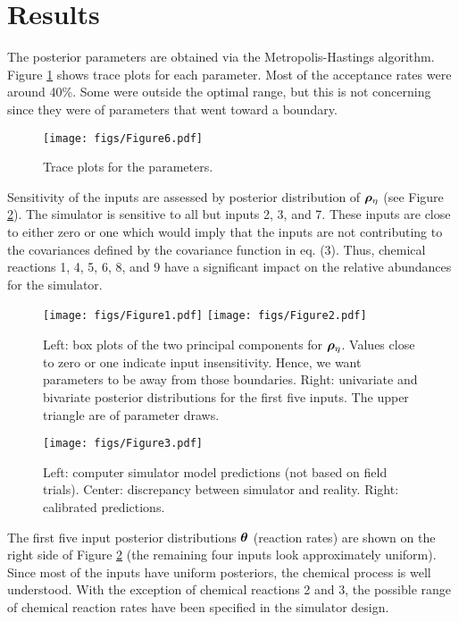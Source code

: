 \section{Results}

The posterior parameters are obtained via the Metropolis-Hastings algorithm. Figure \ref{trace} shows trace plots for each parameter. Most of the acceptance rates were around 40\%. Some were outside the optimal range, but this is not concerning since they were of parameters that went toward a boundary.


\begin{figure}
\begin{center}
\texttt{[image: figs/Figure6.pdf]}
\end{center}
\caption{Trace plots for the parameters.}
\label{trace}
\end{figure}

Sensitivity of the inputs are assessed by posterior distribution of $\mathbf{\bm{\rho}}_\eta$ (see Figure \ref{box}). The simulator is sensitive to all but inputs 2, 3, and 7. These inputs are close to either zero or one which would imply that the inputs are not contributing to the covariances defined by the covariance function in eq. (3). Thus, chemical reactions 1, 4, 5, 6, 8, and 9 have a significant impact on the relative abundances for the simulator.

\begin{figure}
\begin{center}
\texttt{[image: figs/Figure1.pdf]}
\texttt{[image: figs/Figure2.pdf]}
\end{center}
\caption{Left: box plots of the two principal components for $\mathbf{\bm{\rho}}_\eta$. Values close to zero or one indicate input insensitivity. Hence, we want parameters to be away from those boundaries. Right: univariate and bivariate posterior distributions for the first five inputs. The upper triangle are of parameter draws.}
\label{box}
\end{figure}


\begin{figure}
\begin{center}
\texttt{[image: figs/Figure3.pdf]}
\end{center}
\caption{Left: computer simulator model predictions (not based on field trials). Center: discrepancy between simulator and reality. Right: calibrated predictions.}
\label{pred}
\end{figure}

The first five input posterior distributions $\mathbf{\bm{\theta}}$ (reaction rates) are shown on the right side of Figure \ref{box} (the remaining four inputs look approximately uniform). Since most of the inputs have uniform posteriors, the chemical process is well understood. With the exception of chemical reactions 2 and 3, the possible range of chemical reaction rates have been specified in the simulator design.

